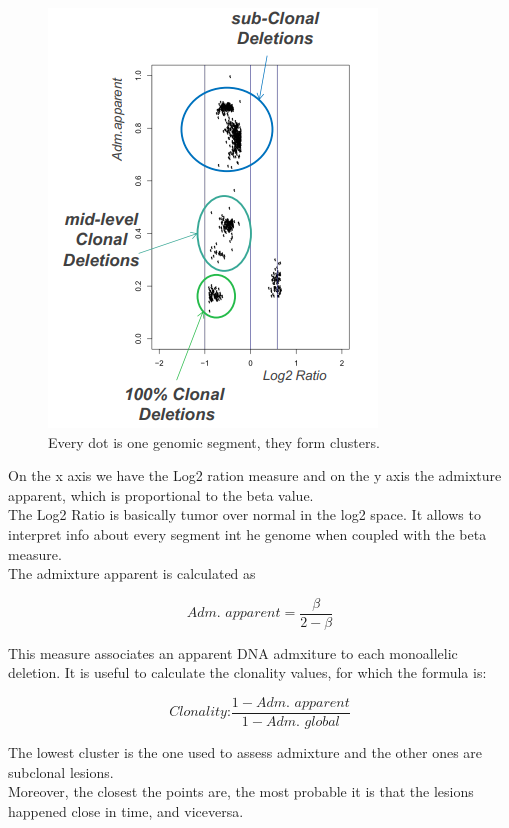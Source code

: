 \begin{figure}
	\includegraphics[width=0.7\linewidth]{adm.png}
	\caption{\label{fig:adm} Every dot is one genomic segment, they form clusters.  }
\end{figure}

On the x axis we have the Log2 ration measure and on the y axis the admixture apparent, which is proportional to the beta  value.\\
The Log2 Ratio is basically tumor over normal in the log2 space. It allows to interpret info about every segment int he genome when coupled with the beta measure.
\\
The admixture apparent is calculated as 

\begin{equation} \label{eq:adm}
\textit{Adm. apparent} = \frac{\beta}{2-\beta}
\end{equation}

This measure associates an apparent DNA admxiture to each monoallelic deletion. It is useful to calculate the clonality values, for which the formula is: 

\begin{equation}
\textit{Clonality:} \frac{1 - \textit{Adm. apparent}}{1 - \textit{Adm. global}}
\end{equation}

The lowest cluster is the one used to assess admixture and the other ones are subclonal lesions.\\
Moreover, the closest the points are, the most probable it is that the lesions happened close in time, and viceversa.

